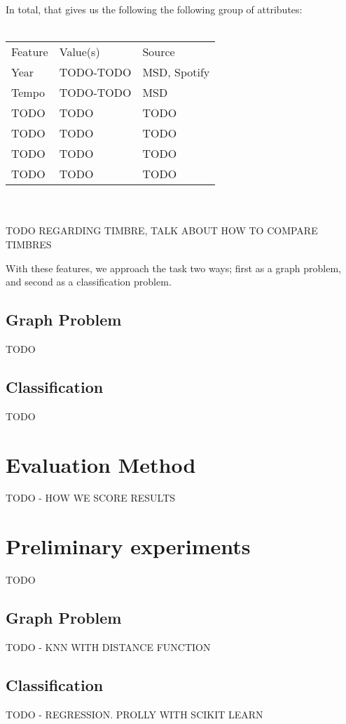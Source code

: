 \documentclass[10pt,journal,compsoc]{IEEEtran}
\begin{document}
In total, that gives us the following the following group of attributes:
\\\\
\begin{tabular}{lll}
Feature    & Value(s)       & Source          \\
Year       & TODO-TODO      & MSD, Spotify    \\
Tempo      & TODO-TODO      & MSD             \\
TODO       & TODO           & TODO            \\
TODO       & TODO           & TODO            \\
TODO       & TODO           & TODO            \\
TODO       & TODO           & TODO            \\
\end{tabular}
\\\\
TODO REGARDING TIMBRE, TALK ABOUT HOW TO COMPARE TIMBRES

With these features, we approach the task two ways; first as a graph problem, and second as a classification problem.

\subsection{Graph Problem}
TODO

\subsection{Classification}
TODO

\section{Evaluation Method}
TODO - HOW WE SCORE RESULTS

\section{Preliminary experiments}
TODO

\subsection{Graph Problem}
TODO - KNN WITH DISTANCE FUNCTION

\subsection{Classification}
TODO - REGRESSION. PROLLY WITH SCIKIT LEARN
\end{document}
